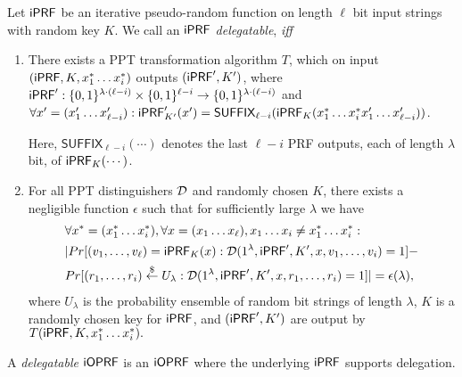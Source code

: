 \begin{definition} \label{def:del}
  Let $\mathsf{i}\mathsf{PRF}$ be an iterative pseudo-random function on length $\ell$
  bit input strings with random key $K$.  We call an $\mathsf{i}\mathsf{PRF}$
  \emph{delegatable}, \emph{iff}
  \begin{enumerate}[leftmargin=*]
  \item There exists a PPT transformation algorithm $T$, which on
    input $(\mathsf{i}\mathsf{PRF},K,x^*_1\ldots{}x^*_i)$ outputs $(\mathsf{i}\mathsf{PRF}',K')$, where
    $\mathsf{i}\mathsf{PRF}':\{0,1\}^{\lambda\cdot(\ell-i)}\times\{0,1\}^{\ell-i}\rightarrow{}\{0,1\}^{\lambda\cdot(\ell-i)}$
    and
    $\forall{}x'=(x'_1\ldots{}x'_{\ell-i}):\mathsf{i}\mathsf{PRF}'_{K'}(x')=\mathsf{SUFFIX}_{\ell-i}(\mathsf{i}\mathsf{PRF}_{K}(x^*_1\ldots{}x^*_ix'_1\ldots{}x'_{\ell-i}))$.

    Here,
    $\mathsf{SUFFIX}_{\ell-i}(\cdots)$ denotes the last $\ell-i$ PRF outputs,
    each of length $\lambda$ bit, of $\mathsf{i}\mathsf{PRF}_K(\cdots)$.

\item For all PPT distinguishers ${\mathcal{D}}$ and randomly chosen $K$,
    there exists a negligible function $\epsilon$ such that for
    sufficiently large $\lambda$ we have
    \begin{align*}
&\forall{}x^*=(x^*_1\ldots{}x^*_i),\forall{}x=(x_1\ldots{}x_\ell),x_1\ldots{}x_i\neq{}x^*_1\ldots{}x^*_i:
\\      &|Pr[(v_1,\ldots,v_\ell)=\iprf_{K}(x):\D(1^\lambda,\iprf',K',x,{v}_1,\ldots,{v}_i)=1]-\\&Pr[(r_1,\ldots,r_i)\getr{}U_{\lambda}:\D(1^\lambda,\iprf',K',x,r_1,\ldots,r_i)=1]|=\epsilon(\lambda),
\ignore{      
           &\forall{}x=(x_1\ldots{}x_\ell),x_1\ldots{}x_i\neq{}x^*_1\ldots{}x^*_i:\\&|Pr[\hat{K}=(\hat{K}_1,\ldots,\hat{K}_\ell)\getr\{0,1\}^{\lambda\cdot\ell},(v_1,\ldots,v_\ell)=\iprf_K(x),\\&(\hat{v}_1,\ldots,\hat{v}_\ell)=\iprf_{\hat{K}}(x):\D(1^\lambda,\iprf',K',(\hat{v}_1,\ldots,\hat{v}_i,v_{i+1},\ldots,v_\ell))=1]\\-&Pr[\D(1^\lambda,\iprf',K',v_1,\ldots,v_\ell)=1]|=\epsilon(\lambda).
}%
    \end{align*}
    where $U_{\lambda}$ is the probability ensemble of random bit
    strings of length $\lambda$, $K$ is a randomly chosen key for
    $\mathsf{i}\mathsf{PRF}$, and $(\mathsf{i}\mathsf{PRF}',K')$ are output by $T(\mathsf{i}\mathsf{PRF}, K,
    x^*_1\ldots{}x^*_i).$
\end{enumerate}

\end{definition}
A \emph{delegatable} $\mathsf{i}\mathsf{OPRF}$ is an $\mathsf{i}\mathsf{OPRF}$
where the underlying $\mathsf{i}\mathsf{PRF}$ supports delegation. 


